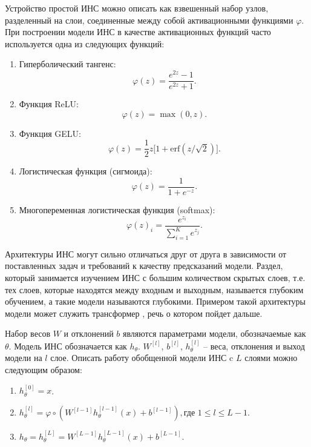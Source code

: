 Устройство простой ИНС можно описать как взвешенный набор узлов, разделенный на слои, соединенные между собой активационными функциями $\varphi$. При построении модели ИНС в качестве активационных функций часто используется одна из следующих функций:
\begin{enumerate}
    \item Гиперболический тангенс:
          \begin{equation}
              \varphi(z) = \frac{e^{2z}-1}{e^{2z}+1}.
          \end{equation}
    \item Функция ReLU:
          \begin{equation}
              \varphi(z) = \max(0, z).
              \label{relu}
          \end{equation}
    \item Функция GELU:
          \begin{equation}
              \varphi(z) = \frac{1}{2}z\Big[1+\text{erf}({z}/\sqrt{2})\Big].
              \label{gelu}
          \end{equation}
    \item Логистическая функция (сигмоида):
          \begin{equation}
              \varphi(z) = \frac{1}{1+e^{-z}}.
          \end{equation}
    \item Многопеременная логистическая функция (softmax):
          \begin{equation}
              \varphi(z)_i = \frac{e^{z_i}}{\sum_{i=1}^{K}e^{z_j}}.
          \end{equation}
\end{enumerate}

Архитектуры ИНС могут сильно отличаться друг от друга в зависимости от поставленных задач и требований к качеству предсказаний модели. Раздел, который занимается изучением ИНС с большим количеством скрытых слоев, т.е. тех слоев, которые находятся между входным и выходным, называется глубоким обучением, а такие модели называются глубокими. Примером такой архитектуры модели может служить  трансформер \cite{transformer-paper}, речь о котором пойдет дальше.

Набор весов $W$ и отклонений $b$ являются параметрами модели, обозначаемые как $\theta$. Модель ИНС обозначается как $h_{\theta}$. $W^{[l]}$, $b^{[l]}$, $h_{\theta}^{[l]}$ -- веса, отклонения и выход модели на $l$ слое. Описать работу обобщенной модели ИНС c $L$ слоями можно следующим образом:
\begin{enumerate}
    \item $h_{\theta}^{[0]} = x$.
    \item $h_{\theta}^{[l]} = \varphi \circ (W^{[l-1]}h_{\theta}^{[l-1]}(x) + b^{[l-1]}), \text{где } 1 \le l \le L-1$.
    \item $h_{\theta} = h_{\theta}^{[L]} = W^{[L-1]}h_{\theta}^{[L-1]}(x) + b^{[L-1]}$.
\end{enumerate}

